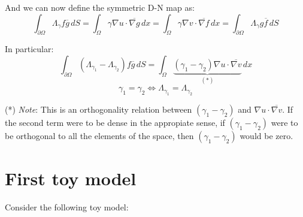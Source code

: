 And we can now define the symmetric D-N map as:
\begin{equation}\label{symmetric-dn-map}
    \int_{\partial \Omega} \Lambda_{\gamma} f \overline{g} \, dS = \int_{\Omega} \gamma \nabla u \cdot \overline{\nabla g} \, dx = \int_{\Omega} \gamma \nabla v \cdot \overline{\nabla f} \, dx = \int_{\partial \Omega} \Lambda_{\gamma} g \overline{f} \, dS
\end{equation}

In particular:
\begin{equation}
    \int_{\partial \Omega} (\Lambda_{\gamma_1} - \Lambda_{\gamma_2}) f \overline{g} \, dS = \int_{\Omega} \underbrace{(\gamma_1 - \gamma_2) \nabla u \cdot \overline{\nabla v}}_{(*)} \, dx 
\end{equation}
\begin{equation}
    \boxed{\gamma_1 = \gamma_2 \iff \Lambda_{\gamma_1} = \Lambda_{\gamma_2}}
\end{equation}

(*) \textit{Note}: This is an orthogonality relation between $(\gamma_1 - \gamma_2)$ and $\nabla u \cdot \overline{\nabla v}$. If the second term were to be dense in the appropiate sense, if $(\gamma_1 - \gamma_2)$ were to be orthogonal to all the elements of the space, then $(\gamma_1 - \gamma_2)$ would be zero.

\section*{First toy model}
Consider the following toy model:


